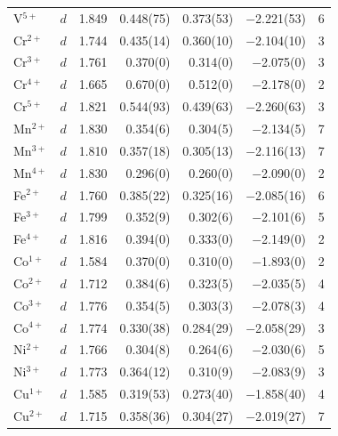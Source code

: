 \begin{longtable}{l l r r r r r}
  V$^{5+}$             & $d$   & 1.849 &      0.448(75) &      0.373(53) &   $-$2.221(53) & 6 \\
  Cr$^{2+}$            & $d$   & 1.744 &      0.435(14) &      0.360(10) &   $-$2.104(10) & 3 \\
  Cr$^{3+}$            & $d$   & 1.761 &       0.370(0) &       0.314(0) &    $-$2.075(0) & 3 \\
  Cr$^{4+}$            & $d$   & 1.665 &       0.670(0) &       0.512(0) &    $-$2.178(0) & 2 \\
  Cr$^{5+}$            & $d$   & 1.821 &      0.544(93) &      0.439(63) &   $-$2.260(63) & 3 \\
  Mn$^{2+}$            & $d$   & 1.830 &       0.354(6) &       0.304(5) &    $-$2.134(5) & 7 \\
  Mn$^{3+}$            & $d$   & 1.810 &      0.357(18) &      0.305(13) &   $-$2.116(13) & 7 \\
  Mn$^{4+}$            & $d$   & 1.830 &       0.296(0) &       0.260(0) &    $-$2.090(0) & 2 \\
  Fe$^{2+}$            & $d$   & 1.760 &      0.385(22) &      0.325(16) &   $-$2.085(16) & 6 \\
  Fe$^{3+}$            & $d$   & 1.799 &       0.352(9) &       0.302(6) &    $-$2.101(6) & 5 \\
  Fe$^{4+}$            & $d$   & 1.816 &       0.394(0) &       0.333(0) &    $-$2.149(0) & 2 \\
  Co$^{1+}$            & $d$   & 1.584 &       0.370(0) &       0.310(0) &    $-$1.893(0) & 2 \\
  Co$^{2+}$            & $d$   & 1.712 &       0.384(6) &       0.323(5) &    $-$2.035(5) & 4 \\
  Co$^{3+}$            & $d$   & 1.776 &       0.354(5) &       0.303(3) &    $-$2.078(3) & 4 \\
  Co$^{4+}$            & $d$   & 1.774 &      0.330(38) &      0.284(29) &   $-$2.058(29) & 3 \\
  Ni$^{2+}$            & $d$   & 1.766 &       0.304(8) &       0.264(6) &    $-$2.030(6) & 5 \\
  Ni$^{3+}$            & $d$   & 1.773 &      0.364(12) &       0.310(9) &    $-$2.083(9) & 3 \\
  Cu$^{1+}$            & $d$   & 1.585 &      0.319(53) &      0.273(40) &   $-$1.858(40) & 4 \\
  Cu$^{2+}$            & $d$   & 1.715 &      0.358(36) &      0.304(27) &   $-$2.019(27) & 7 \\

\end{longtable}
